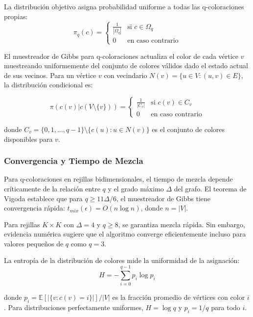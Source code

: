 La distribución objetivo asigna probabilidad uniforme a todas las q-coloraciones propias:
\begin{equation}
\pi_q(c) = \begin{cases}
\frac{1}{|\Omega_q|} & \text{si } c \in \Omega_q \\
0 & \text{en caso contrario}
\end{cases}
\end{equation}

El muestreador de Gibbs para q-coloraciones actualiza el color de cada vértice $v$ muestreando uniformemente del conjunto de colores válidos dado el estado actual de sus vecinos. Para un vértice $v$ con vecindario $N(v) = \{u \in V : (u,v) \in E\}$, la distribución condicional es:

\begin{equation}
\pi(c(v) | c(V \setminus \{v\})) = \begin{cases}
\frac{1}{|C_v|} & \text{si } c(v) \in C_v \\
0 & \text{en caso contrario}
\end{cases}
\end{equation}

donde $C_v = \{0, 1, \ldots, q-1\} \setminus \{c(u) : u \in N(v)\}$ es el conjunto de colores disponibles para $v$.

\subsubsection{Convergencia y Tiempo de Mezcla}

Para q-coloraciones en rejillas bidimensionales, el tiempo de mezcla depende críticamente de la relación entre $q$ y el grado máximo $\Delta$ del grafo. El teorema de Vigoda establece que para $q \geq 11\Delta/6$, el muestreador de Gibbs tiene convergencia rápida: $t_{mix}(\epsilon) = O(n \log n)$, donde $n = |V|$.

Para rejillas $K \times K$ con $\Delta = 4$ y $q \geq 8$, se garantiza mezcla rápida. Sin embargo, evidencia numérica sugiere que el algoritmo converge eficientemente incluso para valores pequeños de $q$ como $q = 3$.

La entropía de la distribución de colores mide la uniformidad de la asignación:
\begin{equation}
H = -\sum_{i=0}^{q-1} p_i \log p_i
\end{equation}

donde $p_i = \mathbb{E}[|\{v : c(v) = i\}|] / |V|$ es la fracción promedio de vértices con color $i$. Para distribuciones perfectamente uniformes, $H = \log q$ y $p_i = 1/q$ para todo $i$.

